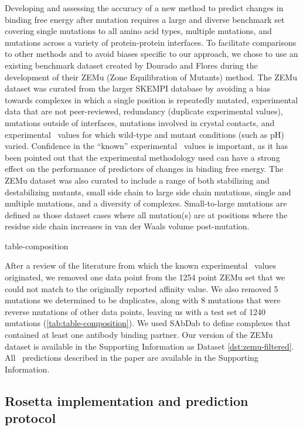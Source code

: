 Developing and assessing the accuracy of a new method to predict changes in binding free energy after mutation requires a large and diverse benchmark set covering single mutations to all amino acid types, multiple mutations, and mutations across a variety of protein-protein interfaces.
To facilitate comparisons to other methods and to avoid biases specific to our approach, we chose to use an existing benchmark dataset created by Dourado and Flores\cite{dourado_multiscale_2014} during the development of their ZEMu (Zone Equilibration of Mutants) method.
The ZEMu dataset was curated from the larger SKEMPI database\cite{moal_skempi:_2012} by avoiding a bias towards complexes in which a single position is repeatedly mutated, experimental data that are not peer-reviewed, redundancy (duplicate experimental values), mutations outside of interfaces, mutations involved in crystal contacts, and experimental \ddg\ values for which wild-type and mutant conditions (such as pH) varied.
Confidence in the ``known'' experimental \ddg\ values is important, as it has been pointed out that the experimental methodology used can have a strong effect on the performance of predictors of changes in binding free energy\cite{geng_exploring_2016}.
The ZEMu dataset was also curated to include a range of both stabilizing and destabilizing mutants, small side chain to large side chain mutations, single and multiple mutations, and a diversity of complexes.
Small-to-large mutations are defined as those dataset cases where all mutation(s) are at positions where the residue side chain increases in van der Waals volume post-mutation\cite{simpson_proteins_2002}.

{table-composition}

After a review of the literature from which the known experimental \ddg\ values originated, we removed one data point from the 1254 point ZEMu set that we could not match to the originally reported affinity value. We also removed 5 mutations we determined to be duplicates, along with 8 mutations that were reverse mutations of other data points, leaving us with a test set of 1240 mutations (\cref{tab:table-composition}).
We used SAbDab \cite{dunbar_sabdab:_2014} to define complexes that contained at least one antibody binding partner.
Our version of the ZEMu dataset is available in the Supporting Information as Dataset \ref{dst:zemu-filtered}.
All \ddg\ predictions described in the paper are available in the Supporting Information.

\subsection{Rosetta implementation and prediction protocol}

